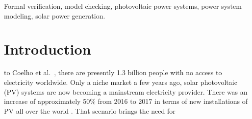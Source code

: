 \documentclass[journal]{IEEEtran}
\begin{document}
\begin{IEEEkeywords}
Formal verification, model checking, photovoltaic power systems, power system modeling, solar power generation.
\end{IEEEkeywords}

%
\IEEEpeerreviewmaketitle



\section{Introduction}
% 
% 
% 
% 
 to Coelho et al.~\cite{Coelho}, there are presently 1.3 billion people with no access to electricity worldwide. 
%
Only a niche market a few years ago, solar photovoltaic (PV) systems are now becoming a mainstream electricity provider. 
There was an increase of approximately 50\% from 2016 to 2017 in terms of new installations of PV all over the world \cite{EPIA}. That scenario brings the need for 
\end{document}
